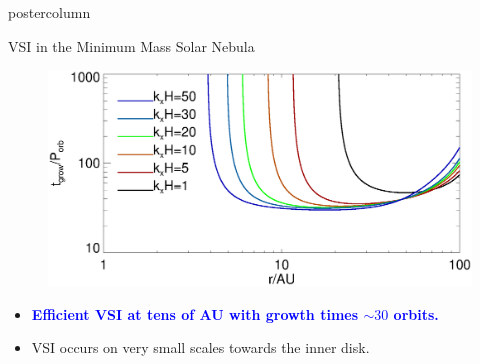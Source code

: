 \documentclass[final,hyperref={pdfpagelabels=false}]{beamer}
\begin{document}
\begin{frame}
\begin{columns}
\begin{column}{.49\textwidth}
\begin{beamercolorbox}[center,wd=\textwidth]{postercolumn}
\begin{minipage}[T]{.95\textwidth}
{\begin{block}{{\Large VSI in the Minimum Mass Solar Nebula}}
\begin{figure}
                  \includegraphics[width=\linewidth]{figures/eigen_compare_grow.ps}
                \end{figure}
                \vspace{-1.5cm}
                \begin{itemize}
                \item \begin{onlinebox}{35cm}\textcolor{blue}{\bf{Efficient
                        VSI at tens of AU with growth times $\sim 30$
                        orbits.}}  \end{onlinebox}
                \item VSI occurs on very small scales towards the inner disk.
                \end{itemize}
              \end{block}
              
}
\end{minipage}
\end{beamercolorbox}
\end{column}
\end{columns}
\end{frame}
\end{document}
